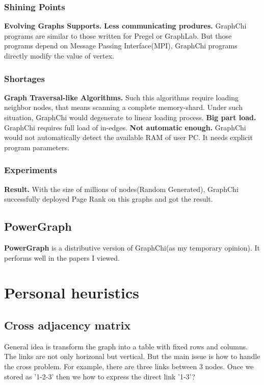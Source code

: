 \documentclass{article}
\begin{document}
	\subsubsection{Shining Points}
	\textbf{Evolving Graphs Supports.}\newline
	\textbf{Less communicating produres.} GraphChi programs are similar to those written for Pregel\cite{malewicz2009pregel:} or GraphLab\cite{low2014graphlab:}. But those programs depend on Message Passing Interface(MPI)\cite{meyer1993message-passing}, GraphChi programs directly modify the value of vertex.
	\subsubsection{Shortages}
	\textbf{Graph Traversal-like Algorithms.} Such this algorithms require loading neighbor nodes, that means scanning a complete memory-shard. Under such situation, GraphChi would degenerate to linear loading process.
	\newline
	\textbf{Big part load.} GraphChi requires full load of in-edges.
	\newline
	\textbf{Not automatic enough.} GraphChi would not automatically detect the available RAM of user PC. It needs explicit program parameters.
	\subsubsection{Experiments}
	\textbf{Result.} With the size of millions of nodes(Random Generated), GraphChi successfully deployed Page Rank\cite{pagerank} on this graphs and got the result.

	\subsection{PowerGraph}
	\textbf{PowerGraph\cite{gonzalez2012powergraph:}} is a distributive version of GraphChi(as my temporary opinion). It performs well in the papers I viewed.

	\newpage
	\section{Personal heuristics}
	\subsection{Cross adjacency matrix}
	General idea is transform the graph into a table with fixed rows and columns. The links are not only horizonal but vertical. But the main issue is how to handle the cross problem. For example, there are three links between 3 nodes. Once we stored as '1-2-3' then we how to express the direct link '1-3'?
\end{document}

